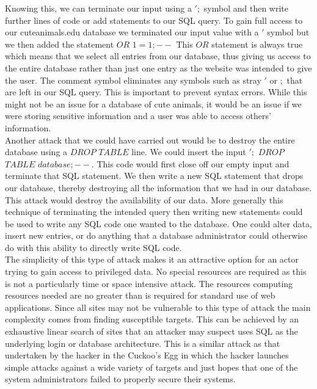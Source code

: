 \documentclass[11pt]{article}
\begin{document}
Knowing this, we can terminate our input using a $';$ symbol and then write further lines of code or add statements to our SQL query. To gain full access to our cuteanimals.edu database we terminated our input value with a $'$ symbol but we then added the statement $OR$ $1=1;--$ This $OR$ statement is always true which means that we select all entries from our database, thus giving us access to the entire database rather than just one entry as the website was intended to give the user. The comment symbol eliminates any symbols such as stray $'$ or $;$ that are left in our SQL query. This is important to prevent syntax errors. While this might not be an issue for a database of cute animals, it would be an issue if we were storing sensitive information and a user was able to access others' information.\\

Another attack that we could have carried out would be to destroy the entire database using a $DROP$ $TABLE$ line. We could insert the input $';$ $DROP$ $TABLE$ $database;--$. This code would first close off our empty input and terminate that SQL statement. We then write a new SQL statement that drops our database, thereby destroying all the information that we had in our database. This attack would destroy the availability of our data. More generally this technique of terminating the intended query then writing new statements could be used to write any SQL code one wanted to the database. One could alter data, insert new entries, or do anything that a database administrator could otherwise do with this ability to directly write SQL code. \\

The simplicity of this type of attack makes it an attractive option for an actor trying to gain access to privileged data. No special resources are required as this is not a particularly time or space intensive attack. The resources computing resources needed are no greater than is required for standard use of web applications. Since all sites may not be vulnerable to this type of attack the main complexity comes from finding susceptible targets. This can be achieved by an exhaustive linear search of sites that an attacker may suspect uses SQL as the underlying login or database architecture. This is a similar attack as that undertaken by the hacker in the Cuckoo's Egg in which the hacker launches simple attacks against a wide variety of targets and just hopes that one of the system administrators failed to properly secure their systems. \\ 
\end{document}
